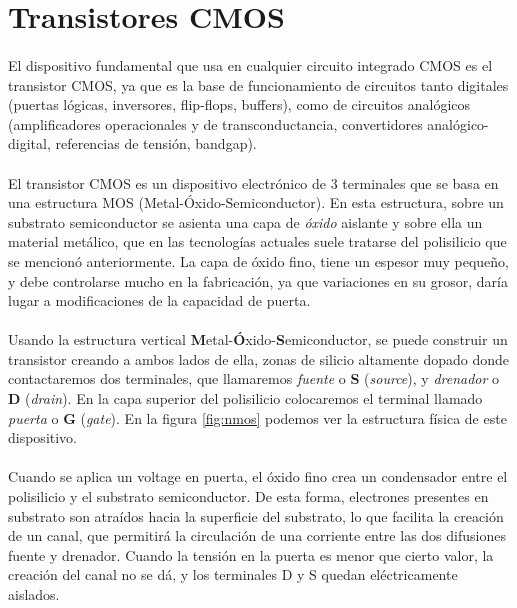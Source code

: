 \section{Transistores CMOS}\label{cap:transistor_cmos}
\paragraph{}
El dispositivo fundamental que usa en cualquier circuito integrado CMOS es el
transistor CMOS, ya que es la base de funcionamiento de circuitos tanto digitales
(puertas lógicas, inversores, flip-flops, buffers), como de circuitos analógicos
(amplificadores operacionales y de transconductancia, convertidores analógico-digital,
referencias de tensión, bandgap).

\paragraph{}
El transistor CMOS es un dispositivo electrónico de 3 terminales que se basa
en una estructura MOS (Metal-Óxido-Semiconductor). En esta estructura, sobre un
substrato semiconductor se asienta una capa de \textit{óxido} aislante y sobre ella un
material metálico, que en las tecnologías actuales suele tratarse del polisilicio
que se mencionó anteriormente. La capa de óxido fino, tiene un espesor muy pequeño,
y debe controlarse mucho en la fabricación, ya que variaciones en su grosor, daría
lugar a modificaciones de la capacidad de puerta.

\paragraph{}
Usando la estructura vertical \textbf{M}etal-\textbf{Ó}xido-\textbf{S}emiconductor,
se puede construir un transistor creando a ambos lados de ella, zonas de silicio
altamente dopado donde contactaremos dos terminales, que llamaremos \textit{fuente} o \textbf{S}
(\textit{source}), y \textit{drenador} o \textbf{D} (\textit{drain}). En la capa superior
del polisilicio colocaremos el terminal llamado \textit{puerta} o \textbf{G} (\textit{gate}).
En la figura \ref{fig:nmos} podemos ver la estructura física de este dispositivo.

\paragraph{}
Cuando se aplica un voltage en puerta, el óxido fino crea un
condensador entre el polisilicio y el substrato semiconductor. De esta forma,
electrones presentes en substrato son atraídos hacia la superficie del substrato,
lo que facilita la creación de un canal, que permitirá la circulación de una
corriente entre las dos difusiones fuente y drenador. Cuando la tensión en la puerta
es menor que cierto valor, la creación del canal no se dá, y los terminales D y S
quedan eléctricamente aislados.

